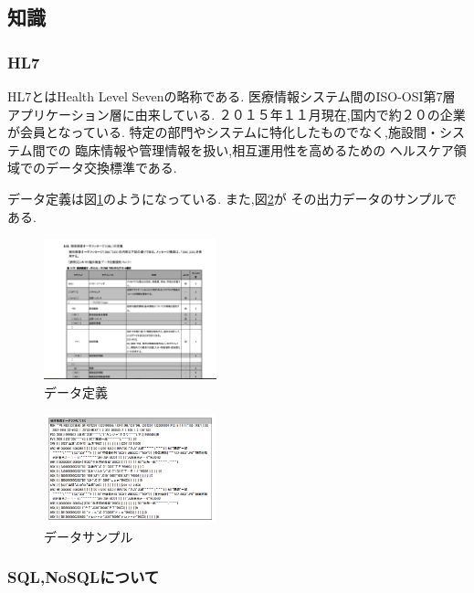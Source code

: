\subsection{知識}

  \subsubsection{HL7 \cite{bibi5} \cite{bibi6} }
  HL7とはHealth Level Sevenの略称である.
  医療情報システム間のISO-OSI第7層アプリケーション層に由来している.
  ２０１５年１１月現在,国内で約２０の企業が会員となっている.
  特定の部門やシステムに特化したものでなく,施設間・システム間での
  臨床情報や管理情報を扱い,相互運用性を高めるための
  ヘルスケア領域でのデータ交換標準である.

  データ定義は図\ref{ss-mix_sample}のようになっている.
  また,図\ref{ss-mix_sampledata}が
  その出力データのサンプルである.


	\begin{figure}[htbp]
		\begin{center}
			\includegraphics[width=5cm, bb=0 0 645 790]{./gazou/ss-mix_sample.png} %
		\end{center}
		\caption{データ定義}
		\label{ss-mix_sample}
	\end{figure}

	\begin{figure}[htbp]
		\begin{center}
			\includegraphics[width=5cm, bb=0 0 437 688]{./gazou/ss-mix_sampledata.png}
		\end{center}
		\caption{データサンプル}
		\label{ss-mix_sampledata}
	\end{figure}



  \subsubsection{SQL,NoSQLについて}




